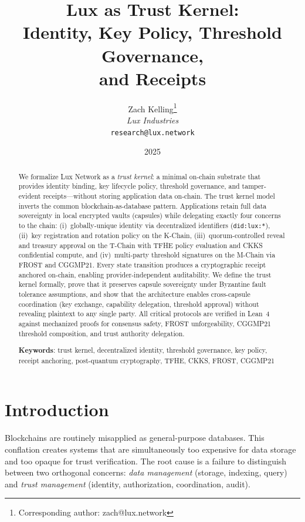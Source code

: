\documentclass[11pt,a4paper]{article}
\title{\textbf{Lux as Trust Kernel:\\Identity, Key Policy, Threshold Governance,\\and Receipts}}
\author{
Zach Kelling\thanks{Corresponding author: zach@lux.network}\\
\textit{Lux Industries}\\
\texttt{research@lux.network}
}
\date{2025}
\begin{document}
\luxcoverpage

\begin{abstract}
We formalize Lux Network as a \emph{trust kernel}: a minimal on-chain substrate that
provides identity binding, key lifecycle policy, threshold governance, and tamper-evident
receipts---without storing application data on-chain. The trust kernel model inverts the
common blockchain-as-database pattern. Applications retain full data sovereignty in local
encrypted vaults (capsules) while delegating exactly four concerns to the chain:
(i)~globally-unique identity via decentralized identifiers (\texttt{did:lux:*}),
(ii)~key registration and rotation policy on the K-Chain,
(iii)~quorum-controlled reveal and treasury approval on the T-Chain with TFHE policy
evaluation and CKKS confidential compute,
and (iv)~multi-party threshold signatures on the M-Chain via FROST and CGGMP21.
Every state transition produces a cryptographic receipt anchored on-chain, enabling
provider-independent auditability. We define the trust kernel formally, prove that it
preserves capsule sovereignty under Byzantine fault tolerance assumptions, and show
that the architecture enables cross-capsule coordination (key exchange, capability
delegation, threshold approval) without revealing plaintext to any single party.
All critical protocols are verified in Lean~4 against mechanized proofs for
consensus safety, FROST unforgeability, CGGMP21 threshold composition, and
trust authority delegation.

\textbf{Keywords}: trust kernel, decentralized identity, threshold governance,
key policy, receipt anchoring, post-quantum cryptography, TFHE, CKKS, FROST, CGGMP21
\end{abstract}

\tableofcontents
\newpage

\section{Introduction}\label{sec:intro}

Blockchains are routinely misapplied as general-purpose databases. This conflation
creates systems that are simultaneously too expensive for data storage and too
opaque for trust verification. The root cause is a failure to distinguish between
two orthogonal concerns: \emph{data management} (storage, indexing, query) and
\emph{trust management} (identity, authorization, coordination, audit).
\end{document}
